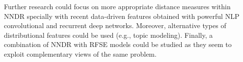 \documentclass[runningheads]{llncs}
\begin{document}
Further research could focus on more appropriate distance measures within NNDR specially with recent data-driven features obtained with powerful NLP convolutional and recurrent deep networks. Moreover, alternative types of distributional features could be used (e.g., topic modeling). Finally, a combination of NNDR with RFSE models could be studied as they seem to exploit complementary views of the same problem.



\end{document}
